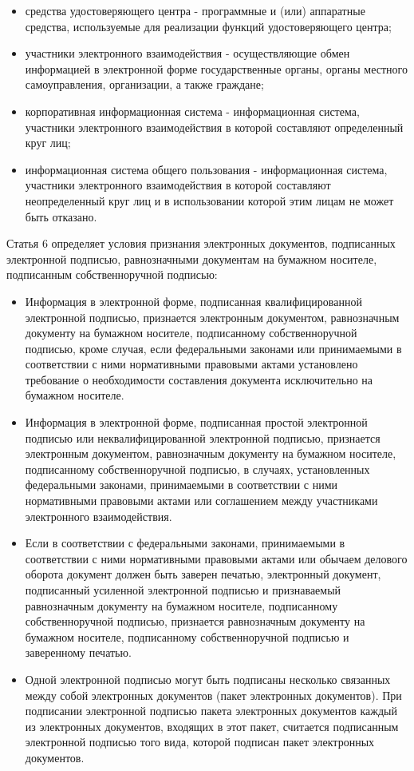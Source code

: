 \begin{itemize}
	\item средства удостоверяющего центра - программные и (или) аппаратные средства, используемые для реализации функций удостоверяющего центра;
	\item участники электронного взаимодействия - осуществляющие обмен информацией в электронной форме государственные органы, органы местного самоуправления, организации, а также граждане;
	\item корпоративная информационная система - информационная система, участники электронного взаимодействия в которой составляют определенный круг лиц;
	\item информационная система общего пользования - информационная система, участники электронного взаимодействия в которой составляют неопределенный круг лиц и в использовании которой этим лицам не может быть отказано.
\end{itemize}

\vspace{\baselineskip}
Статья 6 определяет условия признания электронных документов, подписанных электронной подписью, равнозначными документам на бумажном носителе, подписанным собственноручной подписью:
\begin{itemize}
	\item Информация в электронной форме, подписанная квалифицированной электронной подписью, признается электронным документом, равнозначным документу на бумажном носителе, подписанному собственноручной подписью, кроме случая, если федеральными законами или принимаемыми в соответствии с ними нормативными правовыми актами установлено требование о необходимости составления документа исключительно на бумажном носителе.
	\item Информация в электронной форме, подписанная простой электронной подписью или неквалифицированной электронной подписью, признается электронным документом, равнозначным документу на бумажном носителе, подписанному собственноручной подписью, в случаях, установленных федеральными законами, принимаемыми в соответствии с ними нормативными правовыми актами или соглашением между участниками электронного взаимодействия.
	\item Если в соответствии с федеральными законами, принимаемыми в соответствии с ними нормативными правовыми актами или обычаем делового оборота документ должен быть заверен печатью, электронный документ, подписанный усиленной электронной подписью и признаваемый равнозначным документу на бумажном носителе, подписанному собственноручной подписью, признается равнозначным документу на бумажном носителе, подписанному собственноручной подписью и заверенному печатью.
	\item Одной электронной подписью могут быть подписаны несколько связанных между собой электронных документов (пакет электронных документов). При подписании электронной подписью пакета электронных документов каждый из электронных документов, входящих в этот пакет, считается подписанным электронной подписью того вида, которой подписан пакет электронных документов.
\end{itemize}

